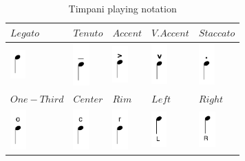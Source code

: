 \begin{table}%
	\centering
	\caption{Timpani playing notation}
	\begin{tabular}{||x{2.3cm}|x{2.3cm}|x{2.3cm}|x{2.3cm}|x{2.3cm}||} \hline
		\small{$Legato$} & \small{$Tenuto$} & \small{$Accent$} & \small{$V.Accent$} & \small{$Staccato$}		\tabularnewline \hline \hline
		\includegraphics[height=10.8mm]{Chapters/6/Pics/Pdf/legato} & \includegraphics[height=16mm]{Chapters/6/Pics/Pdf/tenuto} & \includegraphics[height=14.1mm]{Chapters/6/Pics/Pdf/accent} & \includegraphics[height=15.2mm]{Chapters/6/Pics/Pdf/verticalaccent} & \includegraphics[height=15.5mm]{Chapters/6/Pics/Pdf/staccato} 	\tabularnewline \hline \hline
		\small{$One-Third$} & \small{$Center$} & \small{$Rim$} & \small{$Left$} & \small{$Right$}		\tabularnewline \hline \hline
		\includegraphics[height=15.5mm]{Chapters/6/Pics/Pdf/onethirdlocation} & \includegraphics[height=15.5mm]{Chapters/6/Pics/Pdf/centerlocation} & \includegraphics[height=15.5mm]{Chapters/6/Pics/Pdf/rimlocation} & \includegraphics[height=13.8mm]{Chapters/6/Pics/Pdf/leftbeat} & \includegraphics[height=13.8mm]{Chapters/6/Pics/Pdf/rightbeat} 	\tabularnewline \hline
	\end{tabular}
	\label{tab:notation}
\end{table}

